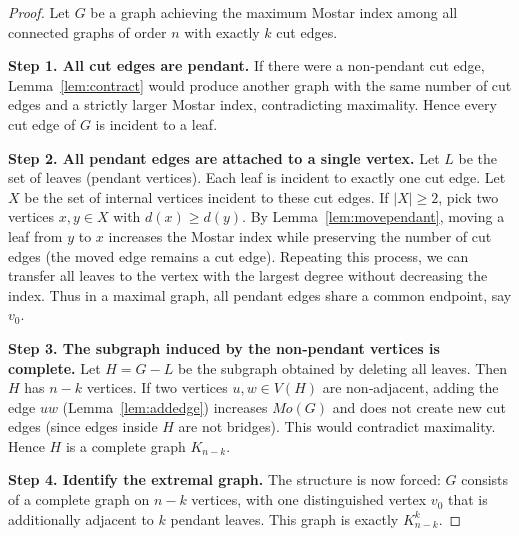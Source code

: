 \documentclass[12pt,a4paper]{article}
\theoremstyle{definition}
\begin{document}
\begin{proof}
Let \(G\) be a graph achieving the maximum Mostar index among all connected graphs of order \(n\) with exactly \(k\) cut edges.

\textbf{Step 1. All cut edges are pendant.} If there were a non‑pendant cut edge, Lemma~\ref{lem:contract} would produce another graph with the same number of cut edges and a strictly larger Mostar index, contradicting maximality. Hence every cut edge of \(G\) is incident to a leaf.

\textbf{Step 2. All pendant edges are attached to a single vertex.} Let \(L\) be the set of leaves (pendant vertices). Each leaf is incident to exactly one cut edge. Let \(X\) be the set of internal vertices incident to these cut edges. If \(|X|\ge2\), pick two vertices \(x,y\in X\) with \(d(x)\ge d(y)\). By Lemma~\ref{lem:movependant}, moving a leaf from \(y\) to \(x\) increases the Mostar index while preserving the number of cut edges (the moved edge remains a cut edge). Repeating this process, we can transfer all leaves to the vertex with the largest degree without decreasing the index. Thus in a maximal graph, all pendant edges share a common endpoint, say \(v_0\).

\textbf{Step 3. The subgraph induced by the non‑pendant vertices is complete.} Let \(H = G - L\) be the subgraph obtained by deleting all leaves. Then \(H\) has \(n-k\) vertices. If two vertices \(u,w\in V(H)\) are non‑adjacent, adding the edge \(uw\) (Lemma~\ref{lem:addedge}) increases \(Mo(G)\) and does not create new cut edges (since edges inside \(H\) are not bridges). This would contradict maximality. Hence \(H\) is a complete graph \(K_{n-k}\).

\textbf{Step 4. Identify the extremal graph.} The structure is now forced: \(G\) consists of a complete graph on \(n-k\) vertices, with one distinguished vertex \(v_0\) that is additionally adjacent to \(k\) pendant leaves. This graph is exactly \(K_{n-k}^k\).


\end{proof}
\end{document}
